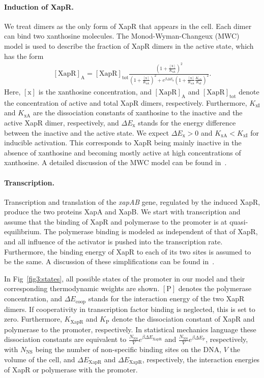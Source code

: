 \documentclass[10pt,letterpaper]{article}
\newcommand{\n}[1]{\mathrm{#1}}
\begin{document}
	\paragraph*{Induction of XapR.} 
	We treat dimers as the only form of XapR that appears in the cell. Each
	dimer can bind two xanthosine molecules. The Monod-Wyman-Changeux (MWC)
	model is used to describe the fraction of XapR dimers in the active state,
	which has the form
	\begin{eqnarray}
	\label{eq:MWC}
	\n{[XapR]_A} = \n{[XapR]_{tot}} \frac{\left(1 + \frac{\n{[x]}}{K_{\n{xA}}}\right)^2}{\left(1 + \frac{\n{[x]}}{K_{\n{xA}}}\right)^2 + e^{\beta \Delta E_{\n{x}}} \left(1+\frac{\n{[x]}}{K_{\n{xA}}} \frac{K_{\n{xA}}}{K_{\n{xI}}}\right)^2}.
	\end{eqnarray}
	Here, $\n{[x]}$ is the xanthosine concentration, and $\n{[XapR]_A}$ and
	$\n{[XapR]_{tot}}$ denote the concentration of active and total XapR dimers,
	respectively. Furthermore, $K_{\n{xI}}$ and $K_{\n{xA}}$ are the
	dissociation constants of xanthosine to the inactive and the active XapR
	dimer, respectively, and $\Delta E_{\n{x}}$ stands for the energy difference
	between the inactive and the active state. We expect $\Delta E_{\n{x}} > 0$
	and $K_{\n{xA}} < K_{\n{xI}}$ for inducible activation. This corresponds to
	XapR being mainly inactive in the absence of xanthosine and becoming mostly
	active at high concentrations of xanthosine. A detailed discussion of the
	MWC model can be found in~\cite{Marzen2013}.
	
	\paragraph*{Transcription.}
	Transcription and translation of the \emph{xapAB} gene, regulated by the
	induced XapR, produce the two proteins XapA and XapB. We start with
	transcription and assume that the binding of XapR and polymerase to the
	promoter is at quasi-equilibrium. The polymerase binding is modeled as
	independent of that of XapR, and all influence of the activator is pushed
	into the transcription rate. Furthermore, the binding energy of XapR to each
	of its two sites is assumed to be the same. A discussion of these
	simplifications can be found in~.
	
	In Fig~\ref{fig3:states}, all possible states of the promoter in our model
	and their corresponding thermodynamic weights are shown. $\n{[P]}$
	denotes the polymerase concentration, and $\Delta E_{\n{coop}}$ stands for
	the interaction energy of the two XapR dimers. If cooperativity in
	transcription factor binding is neglected, this is set to zero. Furthermore,
	$K_{\n{XapR}}$ and $K_{\n{P}}$ denote the dissociation constant of XapR and
	polymerase to the promoter, respectively. In statistical mechanics language
	these dissociation constants are equivalent to
	$\frac{N_{\n{NS}}}{V} e^{\beta \Delta E_{\n{XapR}}}$
	and $\frac{N_{\n{NS}}}{V} e^{\beta \Delta E_{\n{P}}}$, respectively,
	with $N_{\mathrm{NS}}$ being the number of non-specific binding sites on the
	DNA, $V$ the volume of the cell, and $\Delta E_{\n{XapR}}$ and
	$\Delta E_{\n{XapR}}$, respectively, the interaction energies
	of XapR or polymerase with the promoter.
	
\end{document}
